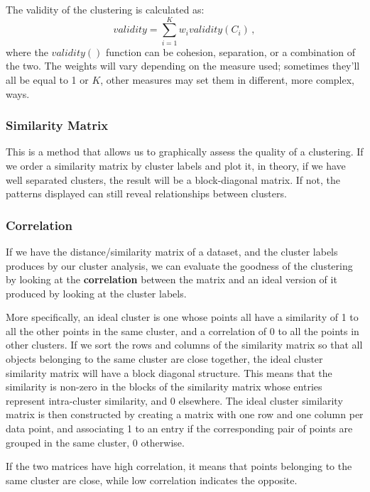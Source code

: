 The validity of the clustering is calculated as:
\begin{equation*}
    validity = \sum_{i=1}^K w_i validity(C_i) \, ,
\end{equation*}
where the $validity()$ function can be cohesion, separation, or a combination of the two. The weights will vary depending on the measure used; sometimes they'll all be equal to 1 or $K$, other measures may set them in different, more complex, ways.

\subsubsection{Similarity Matrix}

This is a method that allows us to graphically assess the quality of a clustering. If we order a similarity matrix by cluster labels and plot it, in theory, if we have well separated clusters, the result will be a block-diagonal matrix. If not, the patterns displayed can still reveal relationships between clusters.

\subsubsection{Correlation}

If we have the distance/similarity matrix of a dataset, and the cluster labels produces by our cluster analysis, we can evaluate the goodness of the clustering by looking at the \textbf{correlation} between the matrix and an ideal version of it produced by looking at the cluster labels.

More specifically, an ideal cluster is one whose points all have a similarity of 1 to all the other points in the same cluster, and a correlation of 0 to all the points in other clusters. If we sort the rows and columns of the similarity matrix so that all objects belonging to the same cluster are close together, the ideal cluster similarity matrix will have a block diagonal structure. This means that the similarity is non-zero in the blocks of the similarity matrix whose entries represent intra-cluster similarity, and 0 elsewhere. The ideal cluster similarity matrix is then constructed by creating a matrix with one row and one column per data point, and associating 1 to an entry if the corresponding pair of points are grouped in the same cluster, 0 otherwise.

If the two matrices have high correlation, it means that points belonging to the same cluster are close, while low correlation indicates the opposite.

